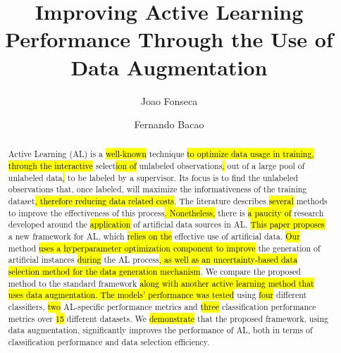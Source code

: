 \documentclass[preprint, 12pt]{elsarticle}
\begin{document}
\begin{frontmatter}

\title{%
    Improving Active Learning Performance Through the Use of Data Augmentation
}

\author[inst1]{Joao Fonseca}
\author[inst1]{Fernando Bacao}


\begin{abstract}

    Active Learning (AL) is a \hl{well-known} technique \hl{to optimize data
    usage in training, through the interactive} select\hl{ion of} unlabeled
    observations\hl{,} out of a large pool of unlabeled data\hl{,} to be
    labeled by a supervisor. Its focus is to find the unlabeled observations
    that, once labeled, will maximize the informativeness of the training
    dataset\hl{, therefore reducing data related costs}.  The literature
    describes \hl{several} methods to improve the effectiveness of this
    process\hl{. Nonetheless,} there is \hl{a paucity of} research developed
    around the \hl{application} of artificial data sources in AL\@. \hl{This
    paper proposes} a new framework for AL, which \hl{relies on the} effective
    use of artificial data.  \hl{Our} method \hl{uses a hyperparameter
    optimization component to improve} the generation of artificial instances
    \hl{during} the AL process\hl{, as well as an uncertainty-based data
    selection method for the data generation mechanism}. We compare the
    proposed method to the standard framework \hl{along with another active
    learning method that uses data augmentation. The models' performance was
    tested} using \hl{four} different classifiers, \hl{two} AL-specific
    performance metrics and \hl{three} classification performance metrics over
    \hl{15} different datasets. We \hl{demonstrate} that the proposed
    framework, using data augmentation, significantly improves the performance
    of AL, both in terms of classification performance and data selection
    efficiency. 

\end{abstract}


\end{frontmatter}
\end{document}
